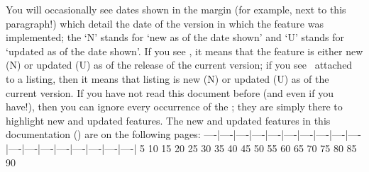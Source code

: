 You will occasionally see dates shown in the margin (for example, next to this
paragraph!)  which detail the date of the version in
which the feature was implemented; the `N' stands for `new as of the date shown' and `U'
stands for `updated as of the date shown'. If you see \stardemo, it means that the
feature is either new (N) or updated (U) as of the release of the current version; if
you see \stardemo\, attached to a listing, then it means that listing is new (N) or
updated (U) as of the current version. If you have not read this document before (and
even if you have!), then you can ignore every occurrence of the \stardemo; they are
simply there to highlight new and updated features. The new and updated features in this
documentation (\gitRel) are on the following pages: \listOfNewFeatures%
----|----|----|----|----|----|----|----|----|----|----|----|----|----|----|----|----|----|
   5   10   15   20   25   30   35   40   45   50   55   60   65   70   75   80   85   90